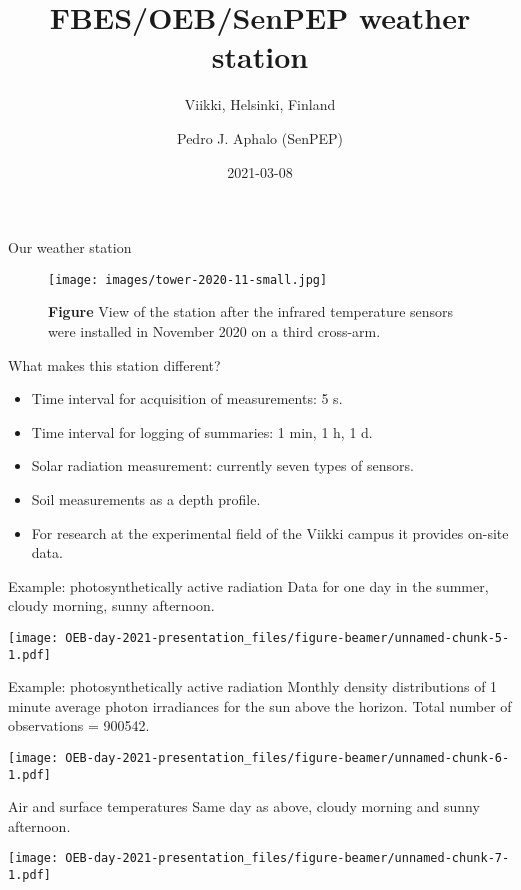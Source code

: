 \documentclass[
  ignorenonframetext,
]{beamer}
\title{FBES/OEB/SenPEP weather station}
\subtitle{Viikki, Helsinki, Finland}
\author{Pedro J. Aphalo (SenPEP)}
\date{2021-03-08}
\providecommand{\tightlist}{%
  \setlength{\itemsep}{0pt}\setlength{\parskip}{0pt}}
\begin{document}
\frame{\titlepage}

\begin{frame}{Our weather station}
\protect\hypertarget{our-weather-station}{}
\begin{figure}
\centering
\texttt{[image: images/tower-2020-11-small.jpg]}
\caption{\textbf{Figure} View of the station after the infrared
temperature sensors were installed in November 2020 on a third
cross-arm.}
\end{figure}
\end{frame}

\begin{frame}{What makes this station different?}
\protect\hypertarget{what-makes-this-station-different}{}
\begin{itemize}
\tightlist
\item
  Time interval for acquisition of measurements: 5 s.
\item
  Time interval for logging of summaries: 1 min, 1 h, 1 d.
\item
  Solar radiation measurement: currently seven types of sensors.
\item
  Soil measurements as a depth profile.
\item
  For research at the experimental field of the Viikki campus it
  provides on-site data.
\end{itemize}
\end{frame}

\begin{frame}{Example: photosynthetically active radiation}
\protect\hypertarget{example-photosynthetically-active-radiation}{}
Data for one day in the summer, cloudy morning, sunny afternoon.

\texttt{[image: OEB-day-2021-presentation\_files/figure-beamer/unnamed-chunk-5-1.pdf]}
\end{frame}

\begin{frame}{Example: photosynthetically active radiation}
\protect\hypertarget{example-photosynthetically-active-radiation-1}{}
Monthly density distributions of 1 minute average photon irradiances for
the sun above the horizon. Total number of observations = 900542.

\texttt{[image: OEB-day-2021-presentation\_files/figure-beamer/unnamed-chunk-6-1.pdf]}
\end{frame}

\begin{frame}{Air and surface temperatures}
\protect\hypertarget{air-and-surface-temperatures}{}
Same day as above, cloudy morning and sunny afternoon.

\texttt{[image: OEB-day-2021-presentation\_files/figure-beamer/unnamed-chunk-7-1.pdf]}
\end{frame}
\end{document}
